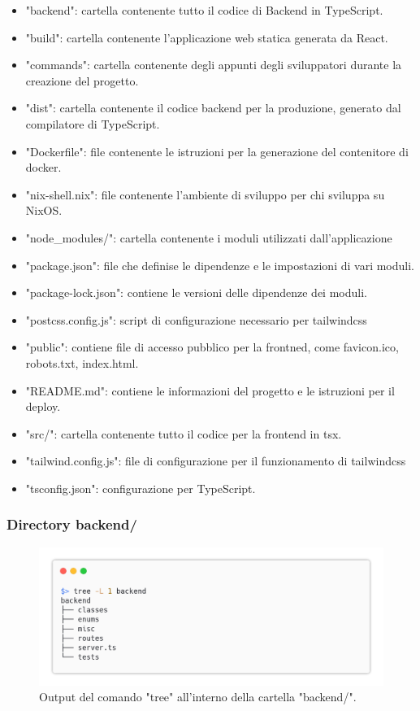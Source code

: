 \documentclass{report}
\begin{document}
\begin{itemize}
	\item "backend": cartella contenente tutto il codice di Backend in TypeScript.
	\item "build": cartella contenente l'applicazione web statica generata da React.
	\item "commands": cartella contenente degli appunti degli sviluppatori durante la creazione del progetto.
	\item "dist": cartella contenente il codice backend per la produzione, generato dal compilatore di TypeScript.
	\item "Dockerfile": file contenente le istruzioni per la generazione del contenitore di docker.
	\item "nix-shell.nix": file contenente l'ambiente di sviluppo per chi sviluppa su NixOS.
	\item "node\_modules/": cartella contenente i moduli utilizzati dall'applicazione
	\item "package.json": file che definise le dipendenze e le impostazioni di vari moduli.
	\item "package-lock.json": contiene le versioni delle dipendenze dei moduli.
	\item "postcss.config.js": script di configurazione necessario per tailwindcss
	\item "public": contiene file di accesso pubblico per la frontned, come favicon.ico, robots.txt, index.html.
	\item "README.md": contiene le informazioni del progetto e le istruzioni per il deploy.
	\item "src/": cartella contenente tutto il codice per la frontend in tsx.
	\item "tailwind.config.js": file di configurazione per il funzionamento di tailwindcss
	\item "tsconfig.json": configurazione per TypeScript.
\end{itemize}


\subsubsection*{Directory backend/}

\begin{figure}[H]
	\centering\includegraphics[width=1\textwidth]{images/tree_backend.png}
	Output del comando "tree" all'interno della cartella "backend/".
\end{figure}
\end{document}
